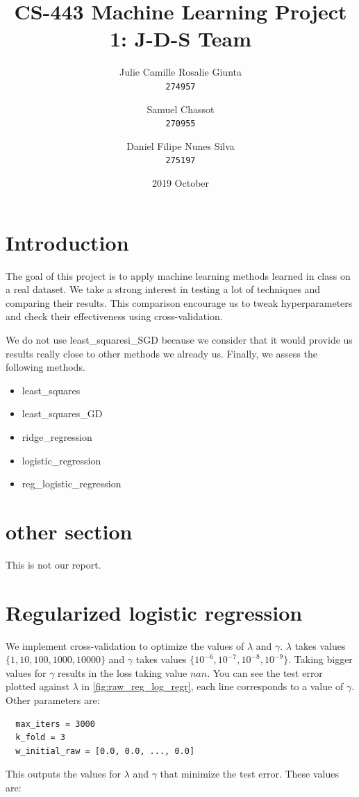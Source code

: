 \documentclass[11pt, a4paper, twoside]{article}
\begin{document}
\date{2019 October}
\title{CS-443 Machine Learning Project 1: J-D-S Team}
\author{
  Julie Camille Rosalie Giunta\\
  \texttt{274957}
  \and
  Samuel Chassot\\
  \texttt{270955}
  \and
  Daniel Filipe Nunes Silva\\
  \texttt{275197}
}

\maketitle
\clearpage

\section{Introduction}
The goal of this project is to apply machine learning
methods learned in class on a real dataset. We take a
strong interest in testing a lot of techniques and
comparing their results. This comparison encourage us to
tweak hyperparameters and check their effectiveness using
cross-validation.

We do not use least\_squaresi\_SGD because we consider
that it would provide us results really close to other
methods we already us. Finally, we assess the following
methods.

\begin{itemize}
  \item least\_squares
  \item least\_squares\_GD 
  \item ridge\_regression
  \item logistic\_regression
  \item reg\_logistic\_regression
\end{itemize}
 
\section{other section}
This is not our report.



\section{Regularized logistic regression}
We implement cross-validation to optimize the values of $\lambda$ and $\gamma$. 
$\lambda$ takes values $\{1,10,100,1000,10000\}$ and $\gamma$ takes values $\{10^{-6},10^{-7},10^{-8},10^{-9}\}$. 
Taking bigger values for $\gamma$ results in the loss taking value $nan$. 
You can see the test error plotted against $\lambda$ in \ref{fig:raw_reg_log_regr}, 
each line corresponds to a value of $\gamma$.
Other parameters are:
\begin{lstlisting}
  max_iters = 3000
  k_fold = 3
  w_initial_raw = [0.0, 0.0, ..., 0.0]
\end{lstlisting}
This outputs the values for $\lambda$ and $\gamma$ that minimize the test error. These values are:
\end{document}
